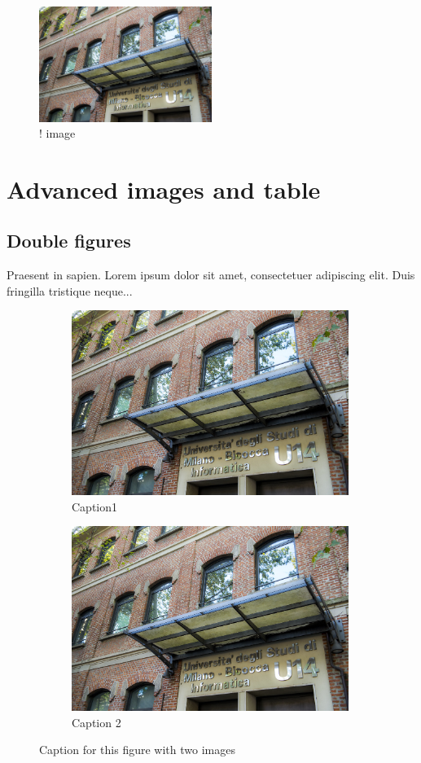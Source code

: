\documentclass[a4paper, oneside]{book}
\begin{document}
\begin{figure}[!]
\includegraphics[width=0.5\textwidth, inner]{u14}
\caption{! image}
\label{fig:figure3}
\end{figure}

\chapter{Advanced images and table}

\section{Double figures}
Praesent in sapien. Lorem ipsum dolor sit amet, consectetuer adipiscing elit. Duis fringilla tristique neque...

\begin{figure}[h]
\begin{subfigure}{0.5\textwidth}
\includegraphics[width=0.9\linewidth, height=6cm]{u14} 
\caption{Caption1}
\label{fig:subim1}
\end{subfigure}
\begin{subfigure}{0.5\textwidth}
\includegraphics[width=0.9\linewidth, height=6cm]{u14}
\caption{Caption 2}
\label{fig:subim2}
\end{subfigure}

\caption{Caption for this figure with two images}
\label{fig:image2}
\end{figure}
\end{document}
